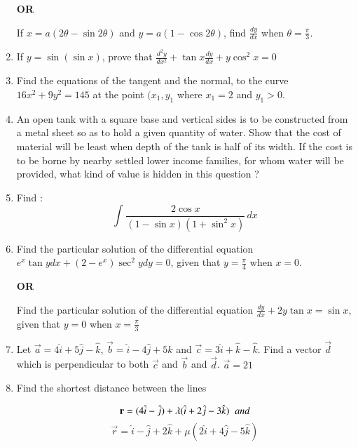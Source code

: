 \documentclass[journal,12pt,twocolumn]{IEEEtran}
\begin{document}
\begin{enumerate}
     \begin{center}
     \textbf{OR}
     \end{center}
     
     If $ x = a(2\theta - \sin 2\theta )$ and 
     $ y = a(1 - \cos 2\theta)$, find $\frac{dy}{dx}$ when $\theta = \frac{\pi}{3}$.
     
     \item If $ y = \sin (\sin x) $,
     prove that 
     $ \frac{d^{2}y}{dx^{2}} + \tan x\frac{dy}{dx} + y\cos^{2} x = 0 $
     
     \item Find the equations of the tangent and the normal, to the curve $ 16x^{2} + 9y^{2} = 145 $ at the point $(x_{1} , y_{1}$ where $x_{1} = 2$ 
     and $y_{1} > 0$.
     
     \item An open tank with a square base and vertical sides is to be constructed from a metal sheet so as to hold a given quantity of water. Show that the cost of material will be least when depth of the tank is half of its width. If the cost is to be borne by nearby settled lower income families, for whom water will be provided, what kind of value is hidden in this question ?
     
     \item Find :
     $$ \int_{}^{} \frac{2\cos x}{(1-\sin x)(1 + \sin^{2} x)} \,dx $$
     
     \item Find the particular solution of the differential equation 
     $e^{x}\tan y dx + (2 - e^{x})\sec^{2} y dy = 0$, given that $y = \frac{\pi}{4}$ when $x=0$. 
     
     \begin{center}
     \textbf{OR}
     \end{center}
     
     Find the particular solution of the differential equation $\frac{dy}{dx} + 2y\tan x = \sin x$, given that $y = 0$ when $x = \frac{\pi}{3}$
     
     \item Let $\vec{a} = 4\hat{i} + 5\hat{j} - \hat{k}$, $\vec{b} = \hat{i} - 4\hat{j} + 5\hat{k}$ and $\vec{c} = 3\hat{i} + \hat{k} - \hat{k}$. Find a vector $\vec{d}$ which is perpendicular to both $\vec{c}$ and $\vec{b}$ and $\vec{d}$. $\vec{a} = 21$
     
     \item Find the shortest distance between the lines 

     $$\vec{r}  = (4\hat{i} - \hat{j}) + \lambda(\hat{i} + 2\hat{j} - 3\hat{k}) \hspace{2mm} and $$  $$\vec{r} = \hat{i} - \hat{j} + 2\hat{k} + \mu(2\hat{i} + 4\hat{j} - 5\hat{k})$$


\end{enumerate}
\end{document}

